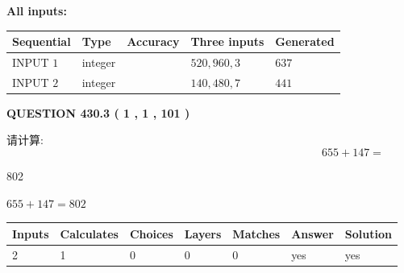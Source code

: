 \documentclass{ctexart}
\begin{document}
   
   
   
\noindent\vspace{0.1in}\hspace{-0.08in} {\textbf{\Large{All inputs: }}}
   
   
  
  
\noindent\begin{tabular}{|l|l|l|l|l|}
\hline
 Sequential & Type & Accuracy & Three inputs & Generated \\ 
\hline
 
 
  INPUT $  1 $ & integer &  & $
 520
 , 
 960
 , 
 3
 $ & $ 637 $ 
 \\  \hline  
 
 
  INPUT $  2 $ & integer &  & $
 140
 , 
 480
 , 
 7
 $ & $ 441 $ 
 \\  \hline  
 \end{tabular}
   
   
  
\vspace{0.2in}
  
{\textbf{\Large{QUESTION
430.3 
 ( 1 , 1 , 101 )
}}}
  
  
 
请计算:
\begin{equation}
655 +  %
147 = \nonumber
\end{equation}
 
 
 
\noindent{}
 
 

802
 
 
\noindent{}
 
 

 
 
 
\noindent{}
 
 

$ %
655 +  %
147=   %
802$
 
 
\noindent{}
 
 

 
   
   
   
   
\noindent\begin{tabular}{|l|l|l|l|l|l|l|}
 \hline
Inputs & Calculates & Choices & Layers & Matches & Answer & Solution \\ \hline
 2  & 
 1  & 
 0
  & 
 0  & 
 0  & 
  yes & 
  yes 
  \\ \hline
 \end{tabular}
   
\end{document}
